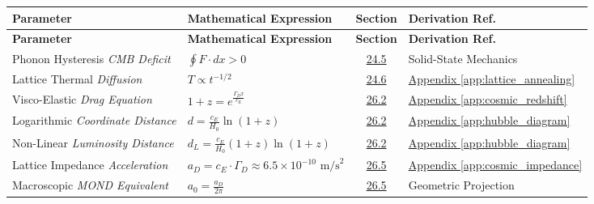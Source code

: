 \vspace{0.5cm}
\noindent
\renewcommand{\arraystretch}{1.6}
\begin{longtable}{@{} p{4.5cm} p{6cm} c p{4cm} @{}}
\toprule
\textbf{Parameter} & \textbf{Mathematical Expression} & \textbf{Section} & \textbf{Derivation Ref.} \\
\midrule
\endfirsthead

\toprule
\textbf{Parameter} & \textbf{Mathematical Expression} & \textbf{Section} & \textbf{Derivation Ref.} \\
\midrule
\endhead

Phonon Hysteresis \newline \textit{CMB Deficit} & $\oint F \cdot dx > 0$ & \hyperref[sec:24.5]{24.5} & Solid-State Mechanics \\

Lattice Thermal \newline \textit{Diffusion} & $T \propto t^{-1/2}$ & \hyperref[sec:24.6]{24.6} & \hyperref[app:lattice_annealing]{Appendix \ref*{app:lattice_annealing}} \\

Visco-Elastic \newline \textit{Drag Equation} & $1+z = e^{\frac{\Gamma_D x}{c_E}}$ & \hyperref[sec:26.2]{26.2} & \hyperref[app:cosmic_redshift]{Appendix \ref*{app:cosmic_redshift}} \\

Logarithmic \newline \textit{Coordinate Distance} & $d = \frac{c_E}{H_0} \ln(1+z)$ & \hyperref[sec:26.2]{26.2} & \hyperref[app:hubble_diagram]{Appendix \ref*{app:hubble_diagram}} \\

Non-Linear \newline \textit{Luminosity Distance} & $d_L = \frac{c_E}{H_0} (1+z)\ln(1+z)$ & \hyperref[sec:26.2]{26.2} & \hyperref[app:hubble_diagram]{Appendix \ref*{app:hubble_diagram}} \\

Lattice Impedance \newline \textit{Acceleration} & $a_D = c_E \cdot \Gamma_D \approx 6.5 \times 10^{-10} \text{ m/s}^2$ & \hyperref[sec:26.5]{26.5} & \hyperref[app:cosmic_impedance]{Appendix \ref*{app:cosmic_impedance}} \\

Macroscopic \newline \textit{MOND Equivalent} & $a_0 = \frac{a_D}{2\pi}$ & \hyperref[sec:26.5]{26.5} & Geometric Projection \\


\end{longtable}
